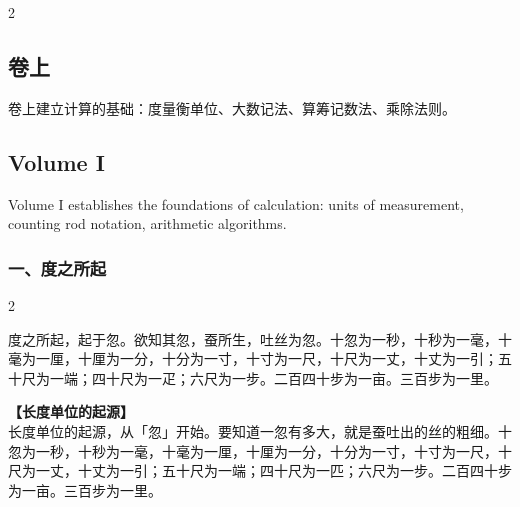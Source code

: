 \documentclass[11pt,a4paper]{article}
\begin{document}
\begin{paracol}{2}

\begin{classicalbox}
\section*{卷上}

卷上建立计算的基础：度量衡单位、大数记法、算筹记数法、乘除法则。
\end{classicalbox}

\switchcolumn

\begin{modernbox}
\section*{Volume I}

Volume I establishes the foundations of calculation: units of measurement, counting rod notation, arithmetic algorithms.
\end{modernbox}

\end{paracol}

\vspace{0.3cm}

\subsubsection*{一、度之所起}
\begin{paracol}{2}
\begin{problemclassical}
度之所起，起于忽。欲知其忽，蚕所生，吐丝为忽。十忽为一秒，十秒为一毫，十毫为一厘，十厘为一分，十分为一寸，十寸为一尺，十尺为一丈，十丈为一引；五十尺为一端；四十尺为一疋；六尺为一步。二百四十步为一亩。三百步为一里。
\end{problemclassical}
\switchcolumn
\begin{problemmodern}
\textbf{【长度单位的起源】}\\
长度单位的起源，从「忽」开始。要知道一忽有多大，就是蚕吐出的丝的粗细。十忽为一秒，十秒为一毫，十毫为一厘，十厘为一分，十分为一寸，十寸为一尺，十尺为一丈，十丈为一引；五十尺为一端；四十尺为一匹；六尺为一步。二百四十步为一亩。三百步为一里。
\end{problemmodern}
\end{paracol}
\end{document}
